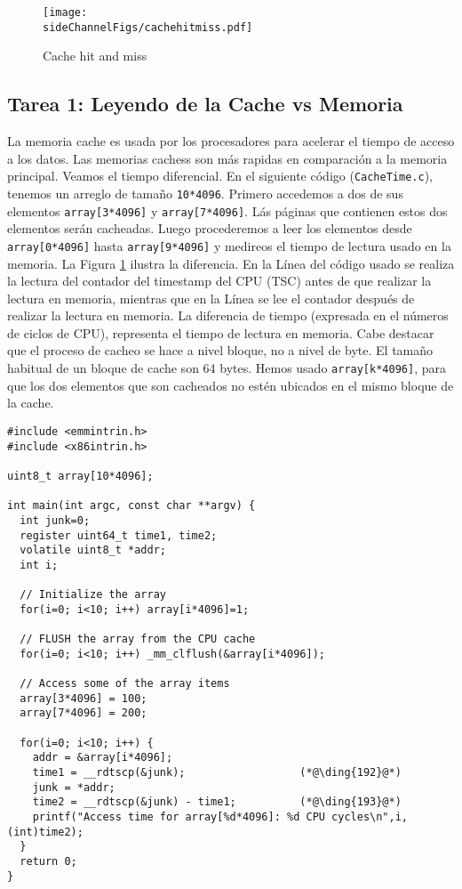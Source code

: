 \begin{figure}[htb]
\centering
\texttt{[image: \\sideChannelFigs/cachehitmiss.pdf]}
\caption{Cache hit and miss}
\label{sidechannel:fig:cachehitmiss}
\end{figure}


\subsection{Tarea 1: Leyendo de la Cache vs Memoria }

La memoria cache es usada por los procesadores para acelerar el tiempo de acceso a los datos. Las memorias cachess son más rapidas en comparación a la memoria principal.
Veamos el tiempo diferencial. En el siguiente código (\texttt{CacheTime.c}), tenemos un arreglo de tamaño \texttt{10*4096}. Primero accedemos a dos de sus elementos \texttt{array[3*4096]} y \texttt{array[7*4096]}. Lás páginas que contienen estos dos elementos serán cacheadas. Luego procederemos a leer los elementos desde \texttt{array[0*4096]} hasta \texttt{array[9*4096]} y medireos el tiempo de lectura usado en la memoria.
La Figura \ref{sidechannel:fig:cachehitmiss} ilustra la diferencia.
En la Línea  del código usado se realiza la lectura del contador del timestamp del CPU (TSC) antes de que realizar la lectura en memoria, mientras que en la Línea  se lee el contador después de realizar la lectura en memoria. La diferencia de tiempo (expresada en el números de ciclos de CPU), representa el tiempo de lectura en memoria.
Cabe destacar que el proceso de cacheo se hace a nivel bloque, no a nivel de byte. El tamaño habitual de un bloque de cache son 64 bytes. Hemos usado \texttt{array[k*4096]}, para que los dos elementos que son cacheados no estén ubicados en el mismo bloque de la cache. 


\begin{lstlisting}[caption=\texttt{CacheTime.c}]
#include <emmintrin.h>
#include <x86intrin.h>

uint8_t array[10*4096];

int main(int argc, const char **argv) {
  int junk=0;
  register uint64_t time1, time2;
  volatile uint8_t *addr;
  int i;
  
  // Initialize the array
  for(i=0; i<10; i++) array[i*4096]=1;

  // FLUSH the array from the CPU cache
  for(i=0; i<10; i++) _mm_clflush(&array[i*4096]);

  // Access some of the array items
  array[3*4096] = 100;
  array[7*4096] = 200;

  for(i=0; i<10; i++) {
    addr = &array[i*4096];
    time1 = __rdtscp(&junk);                  (*@\ding{192}@*)
    junk = *addr;
    time2 = __rdtscp(&junk) - time1;          (*@\ding{193}@*)
    printf("Access time for array[%d*4096]: %d CPU cycles\n",i, (int)time2);
  }
  return 0;
}
\end{lstlisting}

